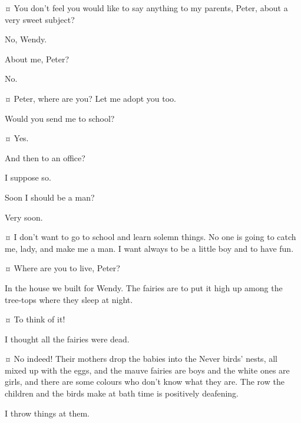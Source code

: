 \begin{drama}
\wendyspeaks {}¤
You don’t feel you would like to say anything to my parents, Peter, about a very sweet subject?

\peterspeaks
No, Wendy.

\wendyspeaks
About me, Peter?

\peterspeaks
No.

\mrsdarlingspeaks {}¤
Peter, where are you?
Let me adopt you too.


\peterspeaks
Would you send me to school?

\mrsdarlingspeaks {}¤
Yes.

\peterspeaks
And then to an office?

\mrsdarlingspeaks
I suppose so.

\peterspeaks
Soon I should be a man?

\mrsdarlingspeaks
Very soon.

\peterspeaks {}¤
I don’t want to go to school and learn solemn things.
No one is going to catch me, lady, and make me a man.
I want always to be a little boy and to have fun.


\mrsdarlingspeaks {}¤
Where are you to live, Peter?

\peterspeaks
In the house we built for Wendy.
The fairies are to put it high up among the tree‐tops where they sleep at night.

\wendyspeaks {}¤
To think of it!

\mrsdarlingspeaks
I thought all the fairies were dead.

\wendyspeaks {}¤
No indeed!
Their mothers drop the babies into the Never birds’ nests, all mixed up with the eggs,
and the mauve fairies are boys and the white ones are girls,
and there are some colours who don’t know what they are.
The row the children and the birds make at bath time is positively deafening.

\peterspeaks
I throw things at them.


\end{drama}
